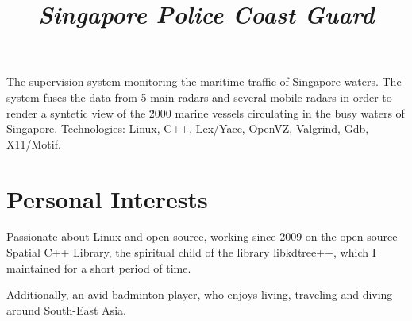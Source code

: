 \documentclass[overlapped,line,letterpaper]{res}
\begin{document}
\begin{resume}
  \title{\em Singapore Police Coast Guard}
  \begin{position}
    The supervision system monitoring the maritime traffic of
    Singapore waters. The system fuses the data from 5 main radars and
    several mobile radars in order to render a syntetic view of the \~2000
    marine vessels circulating in the busy waters of Singapore.
    \newline
    Technologies: Linux, C++, Lex/Yacc, OpenVZ, Valgrind, Gdb, X11/Motif.
  \end{position}



  \section{\bf Personal Interests}

  Passionate about Linux and open-source, working since 2009 on the
  open-source Spatial C++ Library, the spiritual child of the library
  libkdtree++, which I maintained for a short period of time.

  Additionally, an avid badminton player, who enjoys living, traveling and
  diving around South-East Asia.



\end{resume}
\end{document}
